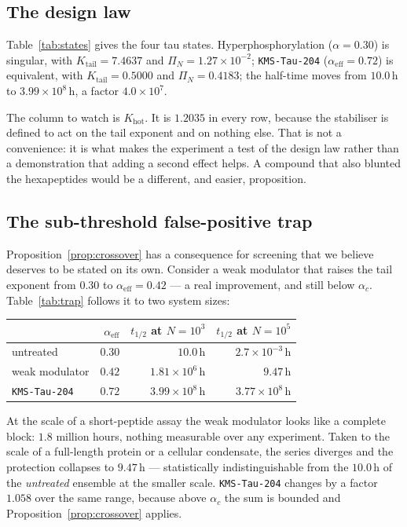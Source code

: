 \documentclass[11pt,reqno]{amsart}
\theoremstyle{plain}
\theoremstyle{definition}
\theoremstyle{remark}
\numberwithin{equation}{section}
\newcommand{\Kt}{K_{\mathrm{tail}}}
\newcommand{\Khot}{K_{\mathrm{hot}}}
\newcommand{\ac}{\alpha_c}
\newcommand{\aeff}{\alpha_{\mathrm{eff}}}
\newcommand{\lead}{\texttt{KMS-Tau-204}}
\begin{document}
\subsection{The design law}
Table~\ref{tab:states} gives the four tau states. Hyperphosphorylation ($\alpha=0.30$) is singular, with $\Kt=7.4637$ and $\Pi_N=1.27\times10^{-2}$; \lead{} ($\aeff=0.72$) is equivalent, with $\Kt=0.5000$ and $\Pi_N=0.4183$; the half-time moves from $10.0$\,h to $3.99\times10^8$\,h, a factor $4.0\times10^{7}$.

The column to watch is $\Khot$. It is $1.2035$ in every row, because the stabiliser is defined to act on the tail exponent and on nothing else. That is not a convenience: it is what makes the experiment a test of the design law rather than a demonstration that adding a second effect helps. A compound that also blunted the hexapeptides would be a different, and easier, proposition.

\subsection{The sub-threshold false-positive trap}
\label{sec:trap}
Proposition~\ref{prop:crossover} has a consequence for screening that we believe deserves to be stated on its own. Consider a weak modulator that raises the tail exponent from $0.30$ to $\aeff=0.42$ --- a real improvement, and still below $\ac$. Table~\ref{tab:trap} follows it to two system sizes:

\begin{center}
\begin{tabular}{@{}l r r r@{}}
\toprule
& $\aeff$ & $t_{1/2}$ at $N=10^3$ & $t_{1/2}$ at $N=10^5$\\
\midrule
untreated & $0.30$ & $10.0$\,h & $2.7\times10^{-3}$\,h\\
weak modulator & $0.42$ & $1.81\times10^{6}$\,h & $9.47$\,h\\
\lead{} & $0.72$ & $3.99\times10^{8}$\,h & $3.77\times10^{8}$\,h\\
\bottomrule
\end{tabular}
\end{center}

At the scale of a short-peptide assay the weak modulator looks like a complete block: $1.8$ million hours, nothing measurable over any experiment. Taken to the scale of a full-length protein or a cellular condensate, the series diverges and the protection collapses to $9.47$\,h --- statistically indistinguishable from the $10.0$\,h of the \emph{untreated} ensemble at the smaller scale. \lead{} changes by a factor $1.058$ over the same range, because above $\ac$ the sum is bounded and Proposition~\ref{prop:crossover} applies.
\end{document}
